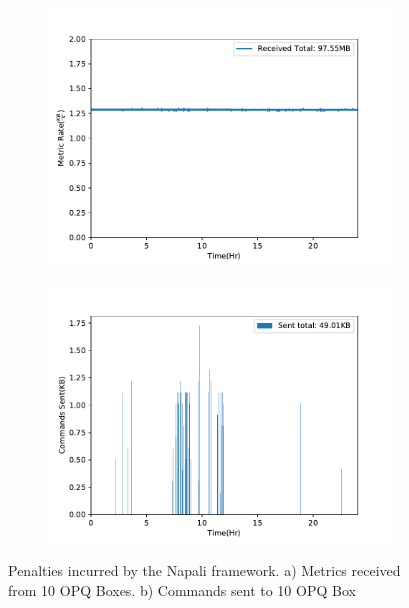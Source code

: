 \begin{figure}[ht!]
    \centering
    \begin{subfigure}{.5\textwidth}
        \centering
        \includegraphics[width=1\linewidth]{img/napali_eval/napali_metric_bandwidth.pdf}
        \caption{}
        \label{expdes:fig:napali_metric_bandwidth}
    \end{subfigure}%
    \begin{subfigure}{.5\textwidth}
        \centering
        \includegraphics[width=1\linewidth]{img/napali_eval/napali_cmd_bandwidth.pdf}
        \caption{}
        \label{expdes:fig:napali_cmd_bandwidth}
    \end{subfigure}
    \caption{Penalties incurred by the Napali framework.
    a) Metrics received from 10 OPQ Boxes.
    b) Commands sent to 10 OPQ Box }
    \label{expdes:fig:napali_bandwidth_penalty}
\end{figure}

